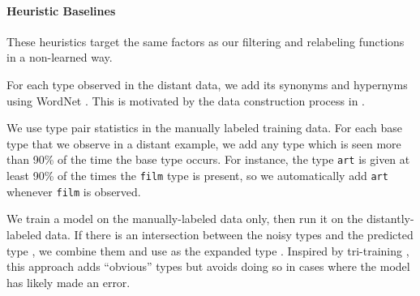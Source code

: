 \documentclass[11pt,a4paper]{article}
\begin{document}
\paragraph{Heuristic Baselines} These heuristics target the same factors as our filtering and relabeling functions in a non-learned way.\begin{description}[align=left, font=\sc, topsep=2pt, labelsep=\fontdimen2\font, leftmargin=0pt]
\setlength\itemsep{-0.1em}
\item [Synonyms and Hypernyms] \hspace{2pt} For each type observed in the distant data, we add its synonyms and hypernyms using WordNet \cite{wordnet_1995}. This is motivated by the data construction process in  \citet{Eunsol_Choi_18}.
\item [Common Type Pairs]  \hspace{2pt} We use type pair statistics in the manually labeled training data. For each base type that we observe in a distant example, we add any type which is seen more than 90\% of the time the base type occurs. For instance, the type \texttt{art} is given at least 90\% of the times the \texttt{film} type is present, so we automatically add \texttt{art} whenever \texttt{film} is observed.  
\item [Overlap] \hspace{2pt} We train a model on the manually-labeled data only, then run it on the distantly-labeled data. If there is an intersection between the noisy types  and the predicted type , we combine them and use as the expanded type . Inspired by tri-training \cite{tri05}, this approach adds ``obvious'' types but avoids doing so in cases where the model has likely made an error. \end{description}
\end{document}
